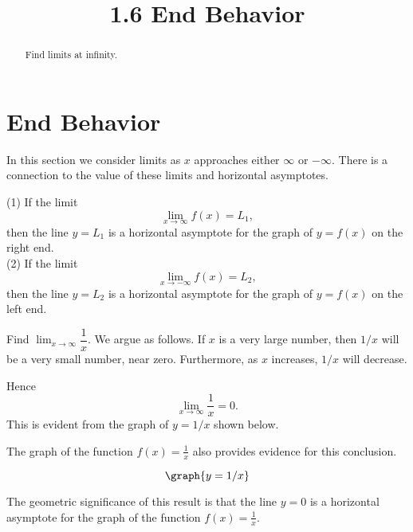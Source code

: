 \documentclass[handout]{ximera}
\title{1.6 End Behavior}
\begin{document}
\begin{abstract}
Find limits at infinity.
\end{abstract}

\maketitle

\section{End Behavior}
 




In this section we consider limits as $x$ approaches either $\infty$ or $-\infty$.
There is a connection to the value of these limits and horizontal asymptotes.

\begin{theorem}
(1) If the limit
\[
\lim_{x \to \infty} f(x) = L_1,
\]
then the line $y=L_1$ is a horizontal asymptote for the graph of $y = f(x)$ on the right end.\\
(2) If the limit
\[
\lim_{x \to -\infty} f(x) = L_2,
\]
then the line $y=L_2$ is a horizontal asymptote for the graph of $y = f(x)$ on the left end.
\end{theorem}



\begin{example}[example 1]
Find $\lim_{x \to \infty} \dfrac{1}{x}.$
  We argue as follows. If $x$ is a very large number, 
	then $1/x$ will be a very small number, near zero.  Furthermore, as $x$ increases, $1/x$ will decrease.
	
	Hence
	\[\lim_{x \to \infty} \frac{1}{x}= 0.\]
	This is evident from the graph of $y=1/x$ shown below.
	
	
	The graph of the function $f(x) = \frac{1}{x}$ also provides evidence for this conclusion.  
	
	\[\graph{y=1/x}\]
	
	The geometric significance of this result is that the line $y=0$  
is a horizontal asymptote for the graph of the function $f(x) = \frac{1}{x}$.
\end{example}
\end{document}
